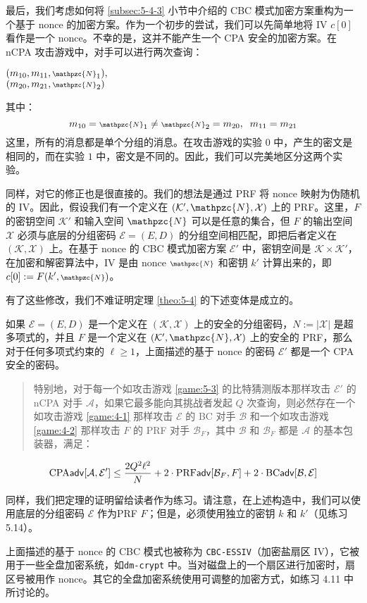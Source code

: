 最后，我们考虑如何将 \ref{subsec:5-4-3} 小节中介绍的 CBC 模式加密方案重构为一个基于 nonce 的加密方案。作为一个初步的尝试，我们可以先简单地将 IV $c[0]$ 看作是一个 nonce。不幸的是，这并不能产生一个 CPA 安全的加密方案。在 nCPA 攻击游戏中，对手可以进行两次查询：

\vspace{5pt}

\hspace*{5pt} $(m_{10},m_{11},{\scriptstyle\mathpzc{N}}_1),$\\
\hspace*{26pt} $(m_{20},m_{21},{\scriptstyle\mathpzc{N}}_2)$

\vspace{5pt}

\noindent
其中：
\[
m_{10}={\scriptstyle\mathpzc{N}}_1\neq{\scriptstyle\mathpzc{N}}_2=m_{20},
\;\;
m_{11}=m_{21}
\]
这里，所有的消息都是单个分组的消息。在攻击游戏的实验 $0$ 中，产生的密文是相同的，而在实验 $1$ 中，密文是不同的。因此，我们可以完美地区分这两个实验。

同样，对它的修正也是很直接的。我们的想法是通过 PRF 将 nonce 映射为伪随机的 IV。因此，假设我们有一个定义在 $(\mathcal{K}',\mathpzc{N},\mathcal{X})$ 上的 PRF。这里，$F$ 的密钥空间 $\mathcal{K}'$ 和输入空间 $\mathpzc{N}$ 可以是任意的集合，但 $F$ 的输出空间 $\mathcal{X}$ 必须与底层的分组密码 $\mathcal{E}=(E,D)$ 的分组空间相匹配，即把后者定义在 $(\mathcal{K},\mathcal{X})$ 上。在基于 nonce 的 CBC 模式加密方案 $\mathcal{E}'$ 中，密钥空间是 $\mathcal{K}\times\mathcal{K}'$，在加密和解密算法中，IV 是由 nonce ${\scriptstyle\mathpzc{N}}$ 和密钥 $k'$ 计算出来的，即 $c[0]:=F(k',{\scriptstyle\mathpzc{N}})$。

有了这些修改，我们不难证明定理 \ref{theo:5-4} 的下述变体是成立的。

\begin{theorem}\label{theo:5-7}
如果 $\mathcal{E}=(E,D)$ 是一个定义在 $(\mathcal{K},\mathcal{X})$ 上的安全的分组密码，$N:=|\mathcal{X}|$ 是超多项式的，并且 $F$ 是一个定义在 $(\mathcal{K}',\mathpzc{N},\mathcal{X})$ 上的安全的 PRF，那么对于任何多项式约束的 $\ell\geq1$，上面描述的基于 nonce 的密码 $\mathcal{E}'$ 都是一个 CPA 安全的密码。
\begin{quote}
特别地，对于每一个如攻击游戏 \ref{game:5-3} 的比特猜测版本那样攻击 $\mathcal{E}'$ 的 nCPA 对手 $\mathcal{A}$，如果它最多能向其挑战者发起 $Q$ 次查询，则必然存在一个如攻击游戏 \ref{game:4-1} 那样攻击 $\mathcal{E}$ 的 BC 对手 $\mathcal{B}$ 和一个如攻击游戏 \ref{game:4-2} 那样攻击 $F$ 的 PRF 对手 $\mathcal{B}_F$，其中 $\mathcal{B}$ 和 $\mathcal{B}_F$ 都是 $\mathcal{A}$ 的基本包装器，满足：
\end{quote}
\begin{equation}\label{eq:5-33}
{\rm CPA}\mathsf{adv}[\mathcal{A},\mathcal{E}']\leq\frac{2Q^2\ell^2}{N}+2\cdot{\rm PRF\mathsf{adv}}[\mathcal{B}_F,F]+2\cdot{\rm BC\mathsf{adv}}[\mathcal{B},\mathcal{E}]
\end{equation}
\end{theorem}

同样，我们把定理的证明留给读者作为练习。请注意，在上述构造中，我们可以使用底层的分组密码 $\mathcal{E}$ 作为PRF $F$；但是，必须使用独立的密钥 $k$ 和 $k'$（见练习 5.14）。

上面描述的基于 nonce 的 CBC 模式也被称为 \texttt{CBC-ESSIV}（加密盐扇区 IV），它被用于一些全盘加密系统，如\texttt{dm-crypt} 中。当对磁盘上的一个扇区进行加密时，扇区号被用作 nonce。其它的全盘加密系统使用可调整的加密方式，如练习 4.11 中所讨论的。